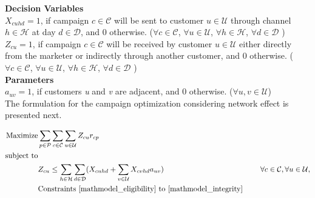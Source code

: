 \documentclass[11pt]{article}
\begin{document}
\noindent \textbf{Decision Variables}\\

\noindent $X_{{c}{u}{h}{d}}=1$, if campaign $c \in \mathcal{C}$ will be sent to customer $u \in \mathcal{U}$ through channel $h \in \mathcal{H}$ at day $d \in \mathcal{D}$, and 0 otherwise.
($\forall c \in \mathcal{C}$, $\forall u \in \mathcal{U}$, $\forall h \in \mathcal{H}$, $\forall d \in \mathcal{D}$ )\\

\noindent $Z_{{c}{u}}=1$, if campaign $c \in \mathcal{C}$ will be received by customer $u \in \mathcal{U}$ either directly from the marketer or indirectly through another customer, and 0 otherwise.
($\forall c \in \mathcal{C}$, $\forall u \in \mathcal{U}$, $\forall h \in \mathcal{H}$, $\forall d \in \mathcal{D}$ )\\

\noindent \textbf{Parameters}\\

\noindent $a_{{u}{v}}=1$, if customers \textit{u} and \textit{v} are adjacent, and 0 otherwise.
($\forall u, v \in \mathcal{U}$)\\


\noindent The formulation for the campaign optimization considering network effect is presented next.

\begin{align}
\text{Maximize} & \displaystyle
\sum\limits_{p\in \mathcal{P}}\sum\limits_{c\in \mathcal{C}}\sum\limits_{u\in \mathcal{U}}Z_{{c}{u}} r_{{c}{p}} \label{mathmodel_w/n_obj}&
\\
\text{subject to} \notag\\
&Z_{{c}{u}} \leq \sum\limits_{h\in \mathcal{H}}\sum\limits_{d\in \mathcal{D}}(X_{{c}{u}{h}{d}}+\sum\limits_{v\in\mathcal{U}}X_{{c}{v}{h}{d}}a_{{u}{v}}) &&&\forall c \in \mathcal{C}, \forall u \in \mathcal{U},\label{mathmodel_w/n_netcoverage}
\\
&\text{Constraints \eqref{mathmodel_eligibility} to \eqref{mathmodel_integrity} }\notag
\end{align}\\
\end{document}
